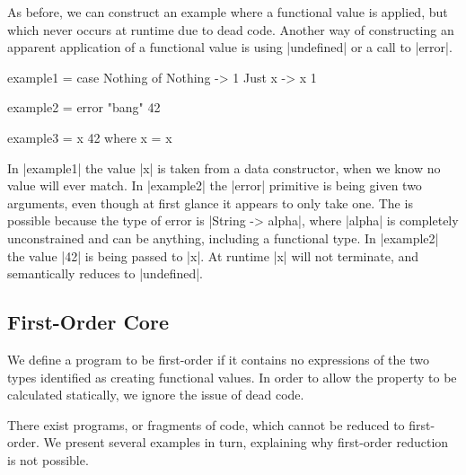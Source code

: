 \documentclass[preprint]{sigplanconf}
\begin{document}
As before, we can construct an example where a functional value is applied, but which never occurs at runtime due to dead code. Another way of constructing an apparent application of a functional value is using |undefined| or a call to |error|.

\begin{example}
\begin{code}
example1 = case  Nothing of
                 Nothing  ->  1
                 Just x   ->  x 1

example2 = error "bang" 42

example3 = x 42
    where x = x
\end{code}

In |example1| the value |x| is taken from a data constructor, when we know no value will ever match. In |example2| the |error| primitive is being given two arguments, even though at first glance it appears to only take one. The is possible because the type of error is |String -> alpha|, where |alpha| is completely unconstrained and can be anything, including a functional type. In |example2| the value |42| is being passed to |x|. At runtime |x| will not terminate, and semantically reduces to |undefined|.
\end{example}

\subsection{First-Order Core}
\label{sec:first_order_restrictions}

We define a program to be first-order if it contains no expressions of the two types identified as creating functional values. In order to allow the property to be calculated statically, we ignore the issue of dead code.

There exist programs, or fragments of code, which cannot be reduced to first-order. We present several examples in turn, explaining why first-order reduction is not possible.
\end{document}
